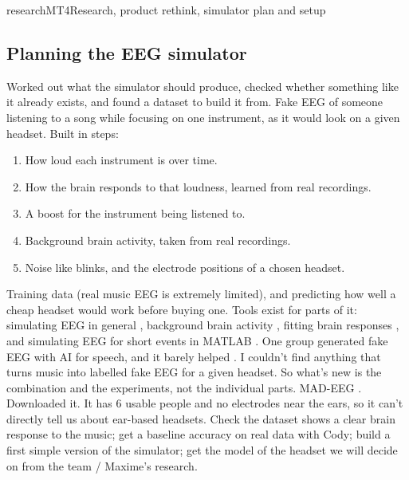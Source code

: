 \begin{entry}{research}{MT4}{Research, product rethink, simulator plan and setup}
\subsection*{Planning the EEG simulator}
Worked out what the simulator should produce, checked whether something like it already exists, and found a dataset to build it from.
Fake EEG of someone listening to a song while focusing on one instrument, as it would look on a given headset. Built in steps:
\begin{enumerate}
  \item How loud each instrument is over time.
  \item How the brain responds to that loudness, learned from real recordings.
  \item A boost for the instrument being listened to.
  \item Background brain activity, taken from real recordings.
  \item Noise like blinks, and the electrode positions of a chosen headset.
\end{enumerate}
Training data (real music EEG is extremely limited), and predicting how well a cheap headset would work before buying one.
Tools exist for parts of it: simulating EEG in general \cite{Gramfort2013}, background brain activity \cite{Cole2019}, fitting brain responses \cite{Brodbeck2023}, and simulating EEG for short events in MATLAB \cite{Krol2018}. One group generated fake EEG with AI for speech, and it barely helped \cite{Rannaleet2026}. I couldn't find anything that turns music into labelled fake EEG for a given headset. So what's new is the combination and the experiments, not the individual parts.
MAD-EEG \cite{Cantisani2019}. Downloaded it. It has 6 usable people and no electrodes near the ears, so it can't directly tell us about ear-based headsets.
Check the dataset shows a clear brain response to the music; get a baseline accuracy on real data with Cody; build a first simple version of the simulator; get the model of the headset we will decide on from the team / Maxime's research.

\end{entry}
